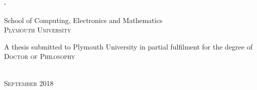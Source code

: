 \begin{titlingpage}
\begin{SingleSpace}
\begin{adjustwidth*}{\unitlength}{-\unitlength}
\begin{center}
\vspace{6mm}
{\large School of Computing, Electronics and Mathematics\\
\textsc{Plymouth University}}\\
\vspace{11mm}
\begin{minipage}{10cm}
A thesis submitted to Plymouth University in partial fulfilment for the degree of \textsc{Doctor of Philosophy}
\end{minipage}\\
\vspace{9mm}
{\large\textsc{September 2018}}
\vspace{12mm}
\end{center}
\begin{flushright}
\end{flushright}
\end{adjustwidth*}
\end{SingleSpace}
\end{titlingpage}